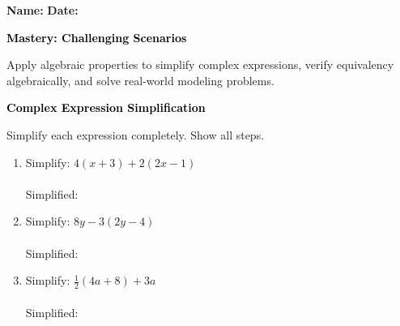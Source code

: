 \documentclass[12pt, letterpaper, fleqn]{article}
\newcommand{\blanklong}{\underline{\hspace{6.5cm}}}
\begin{document}
\textbf{Name:} \underline{\hspace{5cm}}
\hfill
\textbf{Date:} \underline{\hspace{3cm}}\\

\begin{tcolorbox}[colback=black!10]
    \large\textcolor{black}{\textbf{Mastery: Challenging Scenarios}}
\end{tcolorbox}

\vspace{3mm}
\noindent
Apply algebraic properties to simplify complex expressions, verify equivalency algebraically, and solve real-world modeling problems.

\vspace{4mm}

\begin{tcolorbox}[colback=black!10]
\large\textcolor{black}{\textbf{Complex Expression Simplification}}
\end{tcolorbox}

\noindent
Simplify each expression completely. Show all steps.

\vspace{3mm}

\begin{enumerate}[itemsep=1.5cm, leftmargin=0.6cm]

\item Simplify: $4(x + 3) + 2(2x - 1)$ \\ \\
Simplified: \blanklong

\vspace{1.5cm}

\item Simplify: $8y - 3(2y - 4)$ \\ \\
Simplified: \blanklong

\vspace{1.5cm}

\item Simplify: $\frac{1}{2}(4a + 8) + 3a$ \\ \\
Simplified: \blanklong

\vspace{1.5cm}

\end{enumerate}
\end{document}
